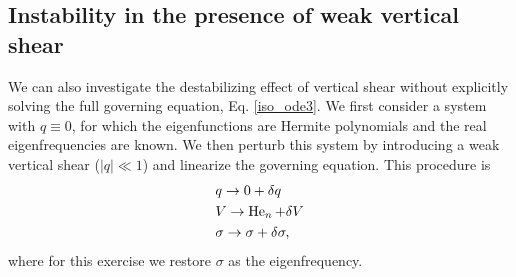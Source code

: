 \subsection{Instability in the presence of weak vertical shear}
We can also investigate the destabilizing effect of vertical shear
without explicitly solving the full governing equation,
Eq. \ref{iso_ode3}. We first
consider a system with $q\equiv0$, for which the eigenfunctions are
Hermite polynomials and the real eigenfrequencies are known. We then
perturb this system by introducing a weak vertical shear ($|q|\ll1$)
and linearize the governing equation. This procedure is
\begin{align}   
  &q \to 0 + \delta q\\
  &V \to \operatorname{He}_n + \delta V \\
  &\sigma \to \sigma + \delta\sigma, 
\end{align}
where for this exercise we restore $\sigma$ as the eigenfrequency. 

